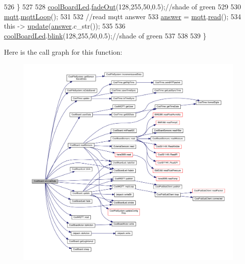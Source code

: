 \begin{DoxyCode}
526     \}
527 
528     \hyperlink{class_cool_board_a1b1d3c684a5baa56b08486e192fd8e97}{coolBoardLed}.\hyperlink{class_cool_board_led_a93d545679237e8cc858324367149775c}{fadeOut}(128,255,50,0.5);\textcolor{comment}{//shade of green        }
529 
530     \hyperlink{class_cool_board_a2399f44d7c23c1149a335cb3b46d90f1}{mqtt}.\hyperlink{class_cool_m_q_t_t_aa5eaae967b562b62cbcf2b8d81f6e5d5}{mqttLoop}();
531 
532     \textcolor{comment}{//read mqtt answer}
533     \hyperlink{class_cool_board_a7b835fafd449e5282f7f91d787a2dc15}{answer} = \hyperlink{class_cool_board_a2399f44d7c23c1149a335cb3b46d90f1}{mqtt}.\hyperlink{class_cool_m_q_t_t_ae3c18f6ae9723746d32765f1c8f176ca}{read}();
534     \textcolor{keyword}{this} -> \hyperlink{class_cool_board_a8612756d3f73198cdde857a66f0fe690}{update}(\hyperlink{class_cool_board_a7b835fafd449e5282f7f91d787a2dc15}{answer}.c\_str()); 
535 
536     \hyperlink{class_cool_board_a1b1d3c684a5baa56b08486e192fd8e97}{coolBoardLed}.\hyperlink{class_cool_board_led_a96e1ea13003eee34c9dbcef340404426}{blink}(128,255,50,0.5);\textcolor{comment}{//shade of green    }
537 
538 
539 \}
\end{DoxyCode}
Here is the call graph for this function\+:
\nopagebreak
\begin{figure}[H]
\begin{center}
\leavevmode
\includegraphics[width=350pt]{d7/df9/class_cool_board_aa0bbc4bc605e35618d18e68795c61363_cgraph}
\end{center}
\end{figure}
\mbox{\label{class_cool_board_a486507b8f0981d3cc671ed31c2145755}} 
